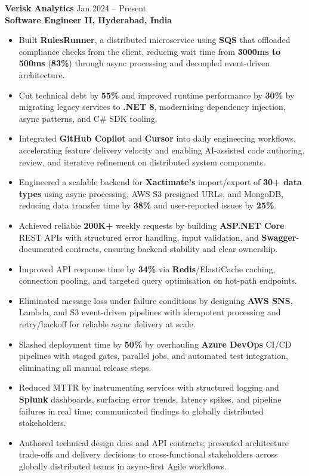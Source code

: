 \documentclass[letterpaper,10pt]{article}
\begin{document}
\textbf{Verisk Analytics} \hfill Jan 2024 -- Present \\
\textbf{Software Engineer II, Hyderabad, India}
\begin{itemize}[leftmargin=*]
    \item Built \textbf{RulesRunner}, a distributed microservice using \textbf{SQS} that offloaded compliance checks from the client, reducing wait time from \textbf{3000ms to 500ms} (\textbf{83\%}) through async processing and decoupled event-driven architecture.
    \item Cut technical debt by \textbf{55\%} and improved runtime performance by \textbf{30\%} by migrating legacy services to \textbf{.NET 8}, modernising dependency injection, async patterns, and C\# SDK tooling.
    \item Integrated \textbf{GitHub Copilot} and \textbf{Cursor} into daily engineering workflows, accelerating feature delivery velocity and enabling AI-assisted code authoring, review, and iterative refinement on distributed system components.
    \item Engineered a scalable backend for \textbf{Xactimate's} import/export of \textbf{30+ data types} using async processing, AWS S3 presigned URLs, and MongoDB, reducing data transfer time by \textbf{38\%} and user-reported issues by \textbf{25\%}.
    \item Achieved reliable \textbf{200K+} weekly requests by building \textbf{ASP.NET Core} REST APIs with structured error handling, input validation, and \textbf{Swagger}-documented contracts, ensuring backend stability and clear ownership.
    \item Improved API response time by \textbf{34\%} via \textbf{Redis}/ElastiCache caching, connection pooling, and targeted query optimisation on hot-path endpoints.
    \item Eliminated message loss under failure conditions by designing \textbf{AWS SNS}, Lambda, and S3 event-driven pipelines with idempotent processing and retry/backoff for reliable async delivery at scale.
    \item Slashed deployment time by \textbf{50\%} by overhauling \textbf{Azure DevOps} CI/CD pipelines with staged gates, parallel jobs, and automated test integration, eliminating all manual release steps.
    \item Reduced MTTR by instrumenting services with structured logging and \textbf{Splunk} dashboards, surfacing error trends, latency spikes, and pipeline failures in real time; communicated findings to globally distributed stakeholders.
    \item Authored technical design docs and API contracts; presented architecture trade-offs and delivery decisions to cross-functional stakeholders across globally distributed teams in async-first Agile workflows.
\end{itemize}
\end{document}
